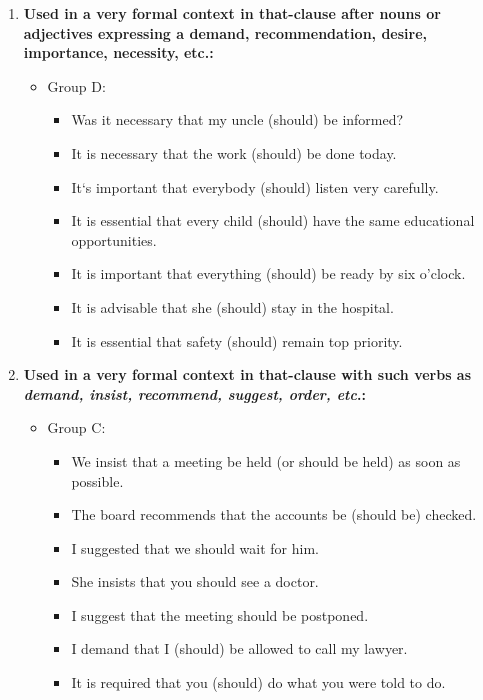 \begin{enumerate}
      \item \textbf{Used in a very formal context in that-clause after nouns or adjectives expressing a demand, recommendation, desire, importance, necessity, etc.:}
            \begin{itemize}
                  \item Group D:
                        \begin{itemize}
                              \item Was it necessary that my uncle (should) be informed?
                              \item It is necessary that the work (should) be done today.
                              \item It`s important that everybody (should) listen very carefully.
                              \item It is essential that every child (should) have the same educational opportunities.
                              \item It is important that everything (should) be ready by six o'clock.
                              \item It is advisable that she (should) stay in the hospital.
                              \item It is essential that safety (should) remain top priority.
                        \end{itemize}
            \end{itemize}

      \item \textbf{Used in a very formal context in that-clause with such verbs as \textit{demand, insist, recommend, suggest, order, etc}.:}
            \begin{itemize}
                  \item Group C:
                        \begin{itemize}
                              \item We insist that a meeting be held (or should be held) as soon as possible.
                              \item The board recommends that the accounts be (should be) checked.
                              \item I suggested that we should wait for him.
                              \item She insists that you should see a doctor.
                              \item I suggest that the meeting should be postponed.
                              \item I demand that I (should) be allowed to call my lawyer.
                              \item It is required that you (should) do what you were told to do.
                        \end{itemize}
            \end{itemize}
\end{enumerate}

